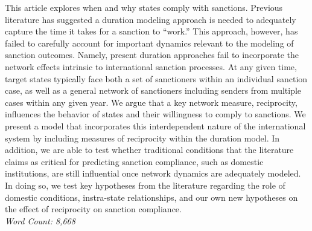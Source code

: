 This article explores when and why states comply with sanctions. Previous literature has suggested a duration modeling approach is needed to adequately capture the time it takes for a sanction to ``work.'' This approach, however, has failed to carefully account for important dynamics relevant to the modeling of sanction outcomes. Namely, present duration approaches fail to incorporate the network effects intrinsic to international sanction processes. At any given time, target states typically face both a set of sanctioners within an individual sanction case, as well as a general network of sanctioners including senders from multiple cases within any given year. We argue that a key network measure, reciprocity, influences the behavior of states and their willingness to comply to sanctions. We present a model that incorporates this interdependent nature of the international system by including measures of reciprocity within the duration model. In addition, we are able to test whether traditional conditions that the literature claims as critical for predicting sanction compliance, such as domestic institutions, are still influential once network dynamics are adequately modeled. In doing so, we test key hypotheses from the literature regarding the role of domestic conditions, instra-state relationships, and our own new hypotheses on the effect of reciprocity on sanction compliance. \\

\noindent \textit{Word Count: 8,668}